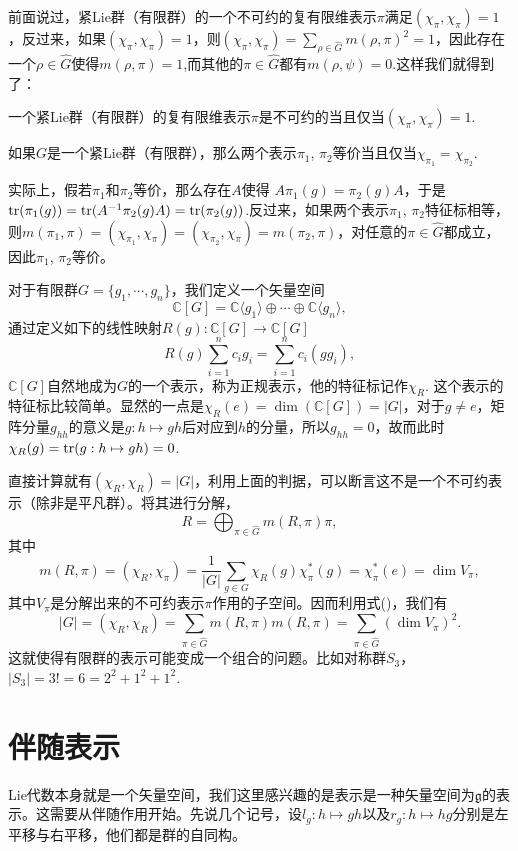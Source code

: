 \documentclass[9pt]{extarticle}
\newcommand{\cc}{\mathbb{C}}
\newcommand{\lag}{{\mathfrak{g}}}
\begin{document}
前面说过，紧Lie群（有限群）的一个不可约的复有限维表示$\pi$满足$(\chi_\pi, \chi_\pi)=1$，反过来，如果$(\chi_\pi, \chi_\pi)=1$，则$(\chi_{\pi},\chi_{\pi})=\sum_{\rho\in\hat{G}}m(\rho,\pi)^2=1$，因此存在一个$\rho\in\hat{G}$使得$m(\rho,\pi)=1$,而其他的$\pi\in\hat{G}$都有$m(\rho,\psi)=0$.这样我们就得到了：

\para 一个紧Lie群（有限群）的复有限维表示$\pi$是不可约的当且仅当$(\chi_{\pi},\chi_{\pi})=1$.

\pro 如果$G$是一个紧Lie群（有限群），那么两个表示$\pi_1$, $\pi_2$等价当且仅当$\chi_{\pi_1}=\chi_{\pi_2}$.

实际上，假若$\pi_1$和$\pi_2$等价，那么存在$A$使得
$A\pi_1(g)=\pi_2(g)A$，于是$\operatorname{tr}(\pi_1(g))=\operatorname{tr}(A^{-1}\pi_2(g)A)=\operatorname{tr}(\pi_2(g))$.反过来，如果两个表示$\pi_1$, $\pi_2$特征标相等，则$	m(\pi_1,\pi)=(\chi_{\pi_1},\chi_\pi)=(\chi_{\pi_2},\chi_\pi)=m(\pi_2,\pi)$，对任意的$\pi\in\hat{G}$都成立，因此$\pi_1$, $\pi_2$等价。

\para 对于有限群$G=\{g_1,\cdots,g_n\}$，我们定义一个矢量空间
\[
	\cc [G]=\cc\langle g_1\rangle \oplus \cdots \oplus \cc\langle g_n\rangle,
\]
通过定义如下的线性映射$R(g):\cc [G]\to \cc [G]$
\[
	R(g)\sum_{i=1}^n c_i g_i=\sum_{i=1}^n c_i(gg_i),
\]
$\cc [G]$自然地成为$G$的一个表示，称为正规表示，他的特征标记作$\chi_R$. 这个表示的特征标比较简单。显然的一点是$\chi_R(e)=\dim (\cc [G])=|G|$，对于$g\neq e$，矩阵分量$g_{hh}$的意义是$g:h\mapsto gh$后对应到$h$的分量，所以$g_{hh}=0$，故而此时$\chi_R(g)=\operatorname{tr}(g:h\mapsto gh)=0$.

直接计算就有$(\chi_{R},\chi_{R})=|G|$，利用上面的判据，可以断言这不是一个不可约表示（除非是平凡群）。将其进行分解，
\[
	R=\bigoplus_{\pi\in\hat{G}}m(R,\pi)\pi,
\]
其中
\[
	m(R,\pi)=(\chi_R,\chi_\pi)=\frac{1}{|G|}\sum_{g\in G}\chi_R(g)\chi_{\pi}^*(g)=\chi_{\pi}^*(e)=\dim V_{\pi},
\]
其中$V_\pi$是分解出来的不可约表示$\pi$作用的子空间。因而利用式(\theequation)，我们有
\[
	|G|=(\chi_{R},\chi_{R})=\sum_{\pi\in\hat{G}}m(R,\pi)m(R,\pi)=\sum_{\pi\in\hat{G}}(\dim V_{\pi})^2.
\]
这就使得有限群的表示可能变成一个组合的问题。比如对称群$S_3$，$|S_3|=3!=6=2^2+1^2+1^2$.

\section{伴随表示}

Lie代数本身就是一个矢量空间，我们这里感兴趣的是表示是一种矢量空间为$\lag$的表示。这需要从伴随作用开始。先说几个记号，设$l_g:h\mapsto gh$以及$r_g:h\mapsto hg$分别是左平移与右平移，他们都是群的自同构。
\end{document}
